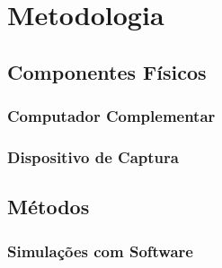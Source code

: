 \chapter{Metodologia}\label{cap:metodologia}



\section{Componentes Físicos}



\subsection{Computador Complementar}



\subsection{Dispositivo de Captura}



\section{Métodos}

\subsection{Simulações com Software}

